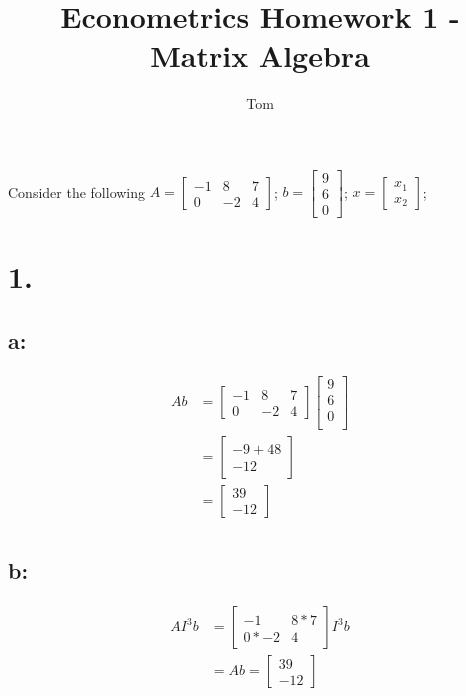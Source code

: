 \documentclass[11pt]{article}
\title{Econometrics Homework 1 - Matrix Algebra}
\author{Tom}
\begin{document}
Consider the following
$A =  \begin{bmatrix}
	  - 1& 8 & 7 \\
	  0 & -2 & 4
	\end{bmatrix}$;
$b = \begin{bmatrix}
	9 \\
	6 \\
	0
       \end{bmatrix}$;
$x = \begin{bmatrix}
	x_{1} \\
	x_{2}
	\end{bmatrix}$;


\section*{1.}
\subsection*{a:}
\begin{align*}
	Ab &= \begin{bmatrix}
	    - 1& 8 & 7 \\
	    0 & -2 & 4
	    \end{bmatrix}
	    \begin{bmatrix}
	     9 \\
	     6 \\
	     0 \\
       \end{bmatrix}\\
       &=
       \begin{bmatrix}
       -9 + 48 \\
       -12
       \end{bmatrix} \\
       &= \begin{bmatrix}
                  39 \\
                 -12
             \end{bmatrix}\\
\end{align*}

\subsection*{b:}
\begin{align*}
    AI^{3}b
    &=
    \begin{bmatrix}
        -1 & 8 * 7 \\
        0 * -2 & 4
    \end{bmatrix}
     I^{3}b\\
     &= Ab =
     \begin{bmatrix}
              39 \\
             -12
     \end{bmatrix}\\     
\end{align*}
\end{document}
